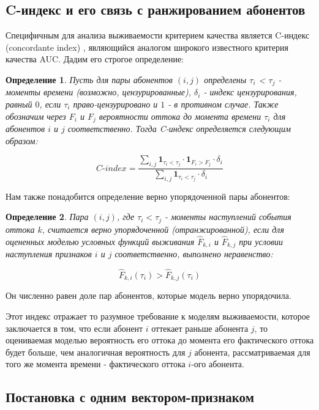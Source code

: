 \documentclass{article}
\newtheorem{definition}{Определение}
\begin{document}
\subsection{C-индекс и его связь с ранжированием абонентов}


Специфичным для анализа выживаемости критерием качества является C-индекс (concordante index) \cite{Alabdallah2022}, являющийся аналогом широкого известного критерия качества AUC. Дадим его строгое определение: 

\begin{definition}
Пусть для пары абонентов $(i,j)$ определены $\tau_i$  < $\tau_j$ - моменты времени (возможно, цензурированные), $\delta_i$ - индекс цензурирования, равный $0$, если $\tau_i$ право-цензурировано и $1$ - в противном случае. Также обозначим через $F_i$ и $F_j$ вероятности оттока до момента времени $\tau_i$ для абонентов $i$ и $j$ соответственно. Тогда C-индекс определяется следующим образом:
	
$$C\text{-}index =
\frac{
	\sum\limits_{i,j} \mathbf{1}_{\tau_i < \tau_j} \cdot \mathbf{1}_{F_i > F_j} \cdot \delta_i
}{
	\sum\limits_{i,j} \mathbf{1}_{\tau_i < \tau_j} \cdot \delta_i
}$$
\end{definition}

Нам также понадобится определение верно упорядоченной пары абонентов: 

\begin{definition}
	Пара $(i,j)$, где $\tau_i < \tau_j$ - моменты наступлений события оттока $k$, считается верно упорядоченной (отранжированной), если для оцененных моделью условных функций выживания $\hat{F}_{k,i}$ и $\hat{F}_{k,j}$ при условии наступления признаков $i$ и $j$ соответственно, выполнено неравенство: 
	
	$$ \hat{F}_{k,i}(\tau_i ) >  \hat{F}_{k,j}(\tau_i ) $$ 
\end{definition}





 Он численно равен доле пар абонентов, которые модель верно упорядочила. 

Этот индекс отражает то разумное требование к моделям выживаемости, которое заключается в том, что если абонент $i$ оттекает раньше абонента $j$, то оцениваемая моделью вероятность его оттока до момента его фактического оттока будет больше, чем аналогичная вероятность для $j$ абонента, рассматриваемая для того же момента времени - фактического оттока $i$-ого абонента. 

\subsection{Постановка с одним вектором-признаком}
\end{document}
